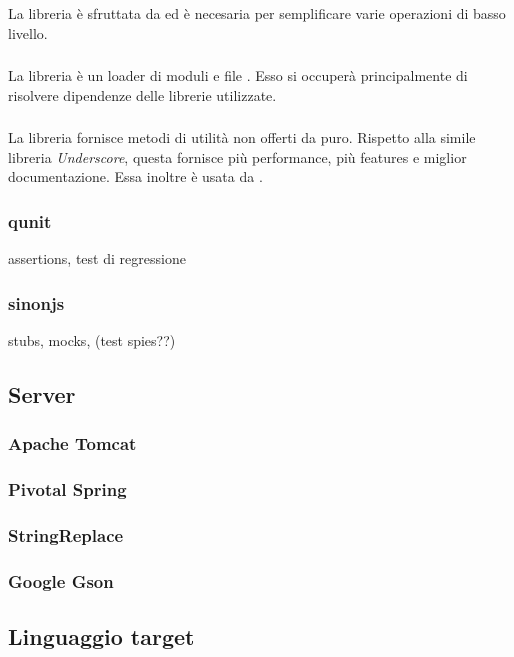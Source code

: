 \subsubsection{\jquery}
La libreria \jquery{} è sfruttata da \jointjs{} ed è necesaria per semplificare varie operazioni di basso livello. 


\subsubsection{\requirejs}
La libreria \requirejs{} è un loader di moduli e file \js{}. Esso si occuperà principalmente di risolvere dipendenze delle librerie \js{} utilizzate.

\subsubsection{\lodash}
La libreria \lodash{} fornisce metodi di utilità non offerti da \js{} puro. Rispetto alla simile libreria \emph{Underscore}, questa fornisce più performance, più features e miglior documentazione. Essa inoltre è usata da \jointjs{}.


\subsubsection{qunit}
assertions, test di regressione
\subsubsection{sinonjs}
stubs, mocks, (test spies??)




\subsection{Server}


\subsubsection{Apache Tomcat}

\subsubsection{Pivotal Spring}

\subsubsection{StringReplace}

\subsubsection{Google Gson}




\subsection{Linguaggio target}

